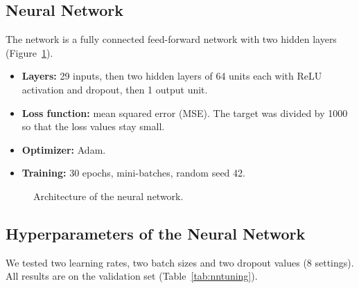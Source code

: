 \documentclass[11pt,a4paper]{article}
\begin{document}
\subsection{Neural Network}
The network is a fully connected feed-forward network with two hidden layers
(Figure~\ref{fig:nn}).
\begin{itemize}
  \item \textbf{Layers:} 29 inputs, then two hidden layers of 64 units each
        with ReLU activation and dropout, then 1 output unit.
  \item \textbf{Loss function:} mean squared error (MSE). The target was
        divided by 1000 so that the loss values stay small.
  \item \textbf{Optimizer:} Adam.
  \item \textbf{Training:} 30 epochs, mini-batches, random seed 42.
\end{itemize}

\begin{figure}[H]
\centering
{}
\caption{Architecture of the neural network.}
\label{fig:nn}
\end{figure}

\subsection{Hyperparameters of the Neural Network}
We tested two learning rates, two batch sizes and two dropout values
(8 settings). All results are on the validation set
(Table~\ref{tab:nntuning}).
\end{document}
